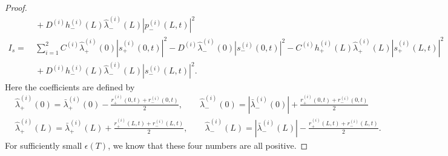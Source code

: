 \documentclass[10pt,a4paper]{amsart}
\begin{document}
\begin{proof}
\begin{align*}
&~+ D^{(i)}h_-^{(i)}(L)\widehat{\lambda}^{(i)}_-(L)|p_-^{(i)}(L,t)|^2\\[2mm]
I_s = &~\sum_{i=1}^2C^{(i)} \widehat{\lambda}^{(i)}_+(0) |s_+^{(i)}(0,t)|^2 -D^{(i)}\widehat{\lambda}^{(i)}_-(0) |s_-^{(i)}(0,t)|^2 -C^{(i)}h_+^{(i)}(L)\widehat{\lambda}^{(i)}_+(L) |s_+^{(i)}(L,t)|^2 \\[2mm]
&~+ D^{(i)}h_-^{(i)}(L)\widehat{\lambda}^{(i)}_-(L)|s_-^{(i)}(L,t)|^2. 
\end{align*}
Here the coefficients are defined by
\begin{align*}
&\widehat{\lambda}^{(i)}_+(0)  =\bar{\lambda}^{(i)}_+(0)-\frac{r^{(i)}_+(0,t)+r^{(i)}_-(0,t)}{2},\qquad 
\widehat{\lambda}^{(i)}_-(0)=|\bar{\lambda}^{(i)}_-(0)|+\frac{r^{(i)}_+(0,t)+r^{(i)}_-(0,t)}{2}\\[2mm]
&\widehat{\lambda}^{(i)}_+(L)  =\bar{\lambda}^{(i)}_+(L)+\frac{r^{(i)}_+(L,t)+r^{(i)}_-(L,t)}{2},\qquad 
\widehat{\lambda}^{(i)}_-(L)=|\bar{\lambda}^{(i)}_-(L)|-\frac{r^{(i)}_+(L,t)+r^{(i)}_-(L,t)}{2}.
\end{align*}
For sufficiently small $\epsilon(T)$, we know that these four numbers are all positive.


\end{proof}
\end{document}
